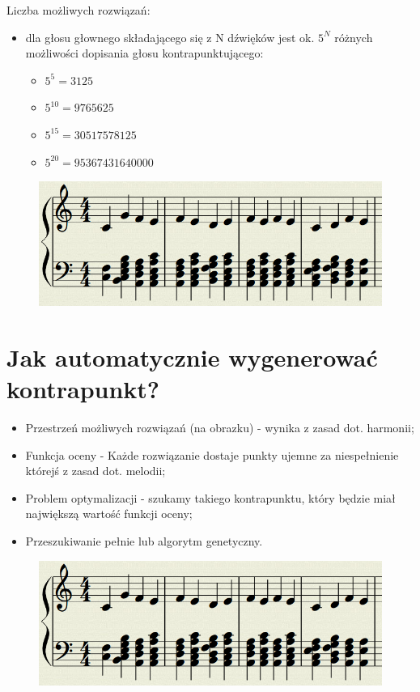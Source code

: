 \documentclass{beamer}
\begin{document}
\begin{frame}

	Liczba możliwych rozwiązań:
	\begin{itemize}
		\item dla głosu głownego składającego się z N dźwięków jest ok. $5^N$ różnych możliwości dopisania głosu kontrapunktującego:
		\begin{itemize}
			\item $5^5 = 3125$
			\item $5^{10} = 9 765 625$
			\item $5^{15} = 30 517 578 125$
			\item $5^{20} = 95 367 431 640 000$
		\end{itemize}
	\end{itemize}
	\begin{figure}
	   \includegraphics[scale=0.3]{images/kontrapunkt_mozliwosci.png}
	\end{figure}
\end{frame}

\section{Jak automatycznie wygenerować kontrapunkt?}

\begin{frame}
	\begin{itemize}
		\item Przestrzeń możliwych rozwiązań (na obrazku) - wynika z zasad dot. harmonii;
		\item Funkcja oceny - Każde rozwiązanie dostaje punkty ujemne za niespełnienie którejś z zasad dot. melodii;
		\item Problem optymalizacji - szukamy takiego kontrapunktu, który będzie miał największą wartość funkcji oceny;
		\item Przeszukiwanie pełnie lub algorytm genetyczny.
	\end{itemize}
	\begin{figure}
	   \includegraphics[scale=0.3]{images/kontrapunkt_mozliwosci.png}
	\end{figure}
\end{frame}
\end{document}
